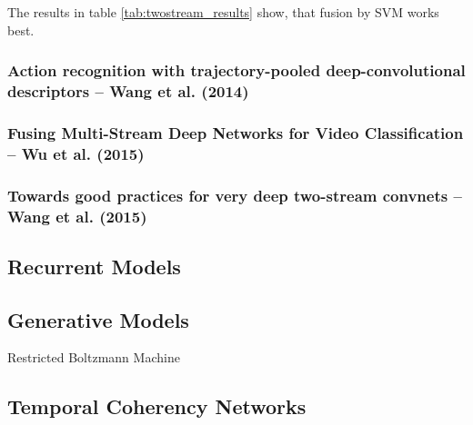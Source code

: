 The results in table \ref{tab:twostream_results} show, that fusion by SVM works best.

\subsubsection{Action recognition with trajectory-pooled deep-convolutional descriptors -- Wang et al. (2014)}

\subsubsection{Fusing Multi-Stream Deep Networks for Video Classification -- Wu et al. (2015)}

\subsubsection{Towards good practices for very deep two-stream convnets -- Wang et al. (2015)}

\subsection{Recurrent Models}

\subsection{Generative Models}
Restricted Boltzmann Machine

\subsection{Temporal Coherency Networks}
